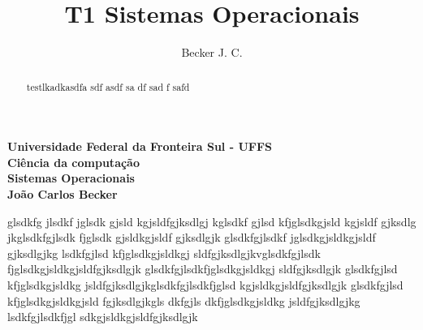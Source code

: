 \documentclass[a4paper,11pt]{article}
\author{Becker J. C.}
\title{T1 Sistemas Operacionais}
\begin{document}
    \begin{center}
        \textbf {Universidade Federal da Fronteira Sul - UFFS\\
        Ciência da computação\\
        Sistemas Operacionais\\
        João Carlos Becker\\}
    \end{center}
    
    \begin{abstract}
        testlkadkasdfa
        sdf
        asdf
        sa
        df
        sad
        f
        safd
        
        
    \end{abstract}
    
    glsdkfg jlsdkf
    jglsdk gjsld
    kgjsldfgjksdlgj
    kglsdkf gjlsd
    kfjglsdkgjsld
    kgjsldf gjksdlg
    jkglsdkfgjlsdk
    fjglsdk gjsldkgjsldf gjksdlgjk
    glsdkfgjlsdkf jglsdkgjsldkgjsldf gjksdlgjkg
    lsdkfgjlsd kfjglsdkgjsldkgj sldfgjksdlgjkvglsdkfgjlsdk fjglsdkgjsldkgjsldfgjksdlgjk
    glsdkfgjlsdkfjglsdkgjsldkgj sldfgjksdlgjk
    glsdkfgjlsd kfjglsdkgjsldkg jsldfgjksdlgjkglsdkfgjlsdkfjglsd kgjsldkgjsldfgjksdlgjk
    glsdkfgjlsd kfjglsdkgjsldkgjsld fgjksdlgjkgls
    dkfgjls dkfjglsdkgjsldkg jsldfgjksdlgjkg lsdkfgjlsdkfjgl sdkgjsldkgjsldfgjksdlgjk
    
    
    
\end{document}
